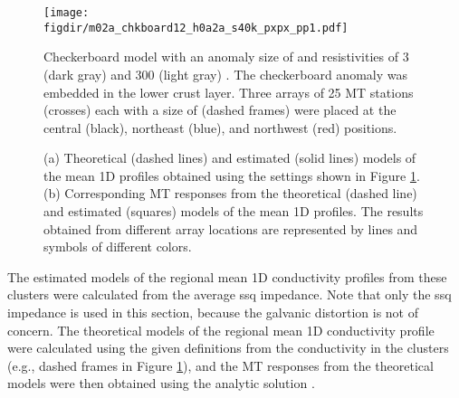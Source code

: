 \begin{figure}[!t]
	\centering
	\texttt{[image: \\figdir/m02a\_chkboard12\_h0a2a\_s40k\_pxpx\_pp1.pdf]}
	\caption[MT array, in which its size is comparable to the anomaly size, located at different position]{Checkerboard model with an anomaly size of {} and resistivities of 3 (dark gray) and 300 (light gray) {\Ohmm}. The checkerboard anomaly was embedded in the lower crust layer. Three arrays of 25 MT stations (crosses) each with a size of {}  (dashed frames) were placed at the central (black), northeast (blue), and northwest (red) positions.}
	\label{fig:model3d_setting_pp1}
\end{figure}
\begin{figure}[!h]
	\centering
	\caption[Theoretical and estimated model of regional mean 1D profile from large MT arrays]{(a) Theoretical (dashed lines) and estimated (solid lines) models of the mean 1D profiles obtained using the settings shown in Figure \ref{fig:model3d_setting_pp1}. (b) Corresponding MT responses from the theoretical (dashed line) and estimated (squares) models of the mean 1D profiles. The results obtained from different array locations are represented by lines and symbols of different colors.}
	\label{fig:cb_resp_pxpx_pp1}
\end{figure}

The estimated models of the regional mean 1D conductivity profiles from these clusters were calculated from the average ssq impedance. Note that only the ssq impedance is used in this section, because the galvanic distortion is not of concern. 
%
The theoretical models of the regional mean 1D conductivity profile were calculated using the given definitions from the conductivity in the clusters (e.g., dashed frames in Figure \ref{fig:model3d_setting_pp1}), and
the MT responses from the theoretical models were then obtained using the analytic solution \citep{constable1987a}.


